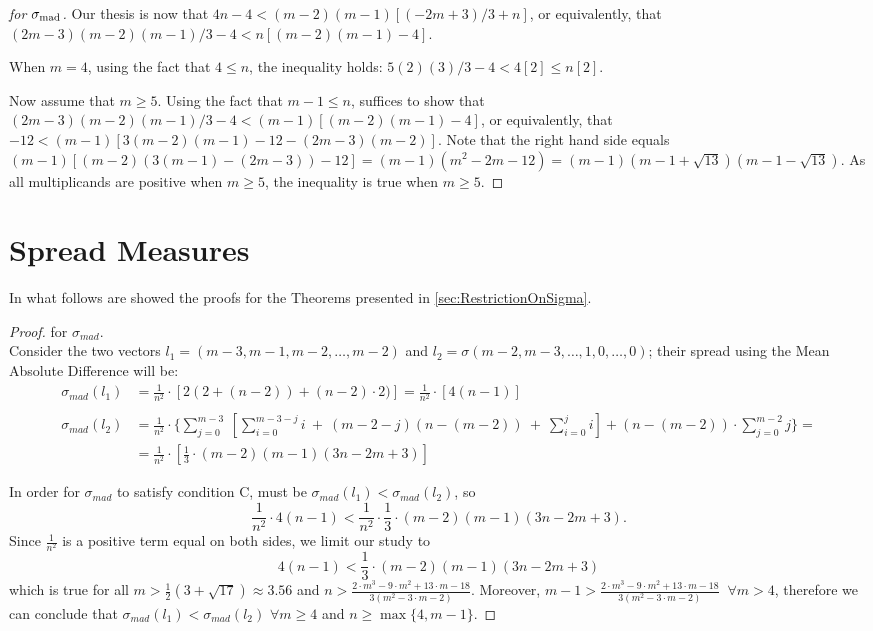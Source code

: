 \documentclass[version=3.21, pagesize, twoside=off, bibliography=totoc, DIV=calc, fontsize=12pt, a4paper]{scrartcl}
\begin{document}
\begin{proof}[for $\sigma_\text{mad}$]
	Our thesis is now that $4n - 4 < (m - 2) (m - 1) [(-2m + 3) / 3 + n]$, or equivalently, that $(2m - 3) (m - 2) (m - 1) / 3 - 4 < n [(m - 2) (m - 1) - 4]$.
	
	When $m = 4$, using the fact that $4 ≤ n$, the inequality holds: $5 (2) (3) / 3 - 4 < 4 [2] ≤ n [2]$.
	
	Now assume that $m ≥ 5$. Using the fact that $m - 1 ≤ n$, suffices to show that
	$(2m - 3) (m - 2) (m - 1) / 3 - 4 < (m - 1) [(m - 2) (m - 1) - 4]$, or equivalently, that
	$-12 < (m - 1) [3 (m - 2) (m - 1) - 12 - (2m - 3) (m - 2)]$.
	Note that the right hand side equals $(m - 1) [(m - 2) (3 (m - 1) - (2m - 3)) - 12] = (m - 1) (m^2 - 2m - 12) = (m - 1) (m - 1 + \sqrt{13}) (m - 1 - \sqrt{13})$. As all multiplicands are positive when $m ≥ 5$, the inequality is true when $m ≥ 5$.
\end{proof}

\section{Spread Measures}
\label{apdx:proofSM}
In what follows are showed the proofs for the Theorems presented in \cref{sec:RestrictionOnSigma}.
\begin{proof} for $\sigma_{mad}$. \\
	Consider the two vectors $l_1=(m-3, m-1, m-2, \dots, m-2)$ and $l_2=\sigma(m-2, m-3, \dots, 1, 0, \dots, 0)$; their spread using the Mean Absolute Difference will be: 
	\begin{equation}
		\begin{split}
			\sigma_{mad}(l_1) &=\frac{1}{n^2} \cdot [2(2+(n-2))+(n-2)\cdot2)]= \frac{1}{n^2} \cdot [4(n-1)] \\ \\
			\sigma_{mad}(l_2)&=\frac{1}{n^2} \cdot \{\sum_{j=0}^{m-3} \ [\sum_{i=0}^{m-3-j}i \ + \ (m-2-j)(n-(m-2)) \ + \ \sum_{i=0}^{j}i] + (n-(m-2))\cdot \sum_{j=0}^{m-2} j \}= \\ &= \frac{1}{n^2} \cdot [\frac{1}{3}\cdot(m-2)(m-1)(3n-2m+3)]
		\end{split}
	\end{equation}
	
	In order for $\sigma_{mad}$ to satisfy condition C, must be $\sigma_{mad}(l_1) < \sigma_{mad}(l_2)$, so
	\[\frac{1}{n^2} \cdot 4(n-1)<\frac{1}{n^2} \cdot \frac{1}{3}\cdot(m-2)(m-1)(3n-2m+3).\]
	Since $\frac{1}{n^2}$ is a positive term equal on both sides, we limit our study to
	\[4(n-1)<\frac{1}{3}\cdot(m-2)(m-1)(3n-2m+3)\]
	which is true for all $m> \frac{1}{2}(3+\sqrt{17})\approx 3.56$ and $n>\frac{2 \cdot m^3 - 9\cdot m^2 + 13\cdot m - 18}{3 (m^2 - 3 \cdot m - 2)}$. Moreover, $m-1>\frac{2 \cdot m^3 - 9\cdot m^2 + 13\cdot m - 18}{3 (m^2 - 3 \cdot m - 2)}$ $\ \forall m>4$, therefore we can conclude that $\sigma_{mad}(l_1)<\sigma_{mad}(l_2)$ $\forall m\geq4$ and $n\geq\max\{4,m-1\}$.
\end{proof}
\end{document}
